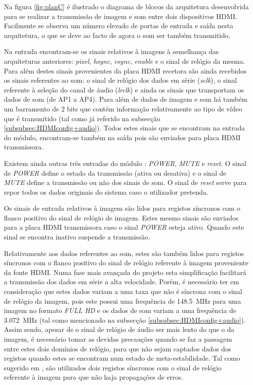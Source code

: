 Na figura \ref{fig:planC}  é ilustrado o diagrama de blocos da arquitetura desenvolvida para se realizar a transmissão de imagem e som entre dois dispositivos HDMI. Facilmente se observa um número elevado de portas de entrada e saída nesta arquitetura, o que se deve ao facto de agora o som ser também transmitido.

Na entrada encontram-se os sinais relativos à imagens à semelhança das arquiteturas anteriores: \textit{pixel}, \textit{hsync}, \textit{vsync}, \textit{enable} e o sinal de relógio da mesma. Para além destes sinais provenientes da placa HDMI recetora são ainda recebidos os sinais referentes ao som: o sinal de relógio dos dados em série (\textit{sclk}), o sinal referente à seleção do canal de áudio (\textit{lrclk}) e ainda os sinais que transportam os dados de som (de AP1 a AP4). Para além de dados de imagem e som há também um barramento de 2 bits que contém informação relativamente ao tipo de vídeo que é transmitido (tal como já referido na subsecção \ref{subsubsec:HDMIconfig+audio}). Todos estes sinais que se encontram na entrada do módulo, encontram-se também na saída pois são enviados para placa HDMI transmissora.

Existem ainda outras três entradas do módulo : \textit{POWER}, \textit{MUTE} e \textit{reset}. O sinal de \textit{POWER} define o estado da transmissão (ativa ou desativa) e o sinal de \textit{MUTE} define a transmissão ou não dos sinais de som. O sinal de \textit{reset} serve para repor todos os dados originais do sistema caso o utilizador pretenda.

Os sinais de entrada relativos à imagem são lidos para registos síncronos com o flanco positivo do sinal de relógio de imagem. Estes mesmo sinais são enviados para a placa HDMI transmissora caso o sinal \textit{POWER} esteja ativo. Quando este sinal se encontra inativo suspende a transmissão.

Relativamente aos dados referentes ao som, estes são também lidos para registos síncronos com o flanco positivo do sinal de relógio referente à imagem proveniente da fonte HDMI. Numa fase mais avançada do projeto esta simplificação facilitará a transmissão dos dados em série a alta velocidade. Porém, é necessário ter em consideração que estes dados variam a uma taxa que não é síncrona com o sinal de relógio da imagem, pois este possui uma frequência de \SI{148.5}{\mega\hertz} para uma imagem no formato \textit{FULL HD} e os dados de som variam a uma frequência de \SI{3.072}{\mega\hertz} (tal como mencionado na subsecção \ref{subsubsec:HDMIconfig+audio}). Assim sendo, apesar de o sinal de relógio de áudio ser mais lento do que o da imagem, é necessário tomar as devidas precauções quando se faz a passagem entre estes dois domínios de relógio, para que não sejam captados dados dos registos quando estes se encontram num estado de meta-estabilidade. Tal como sugerido em \cite{R024}, são utilizados dois registos síncronos com o sinal de relógio referente à imagem para que não haja propagações de erros.


